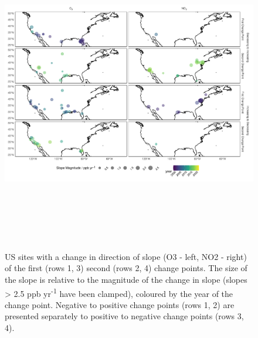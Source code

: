 \documentclass[journal abbreviation, manuscript]{copernicus}
\begin{document}
\begin{figure}
\includegraphics[height=14cm]{figures/f10_us_mag_map.pdf}
\caption{US sites with a change in direction of slope (O3 - left, NO2 - right) of the first (rows 1, 3) second (rows 2, 4) change points. The size of the slope is relative to the magnitude of the change in slope (slopes > 2.5 ppb yr\textsuperscript{-1} have been clamped), coloured by the year of the change point. Negative to positive change points (rows 1, 2) are presented separately to positive to negative change points (rows 3, 4).}
\label{fig:us_changepoint_map}
\end{figure}
\end{document}
